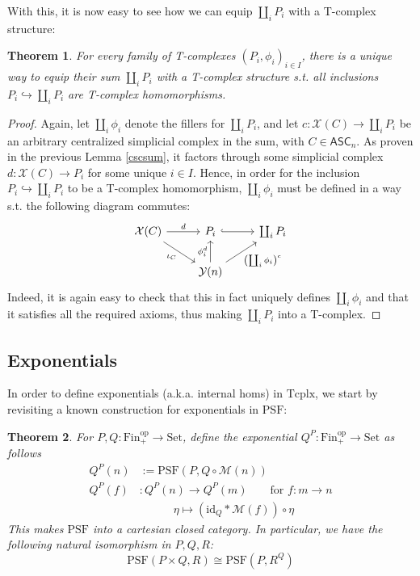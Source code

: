 \documentclass{article}
\newtheorem{theorem}{Theorem}[subsection]
\theoremstyle{remark}
\theoremstyle{definition}
\newcommand{\Fin}{\mathrm{Fin}}
\newcommand{\Set}{\mathrm{Set}}
\newcommand{\PSF}{\mathrm{PSF}}
\newcommand{\op}{\mathrm{op}}
\newcommand{\ASC}{\mathsf{ASC}}
\newcommand{\id}{\mathrm{id}}
\newcommand{\Y}{\mathcal Y}
\newcommand{\X}{\mathcal X}
\newcommand{\Tcplx}{\mathrm{Tcplx}}
\newcommand{\M}{\mathcal M}
\begin{document}
	With this, it is now easy to see how we can equip $\coprod_iP_i$ with a T-complex structure:
	\begin{theorem}
		For every family of T-complexes $(P_i,\phi_i)_{i\in I}$, there is a unique way to equip their sum $\coprod_iP_i$ with a T-complex structure s.t. all inclusions $P_i\hookrightarrow\coprod_iP_i$ are T-complex homomorphisms.
	\end{theorem}
	\begin{proof}
		Again, let $\coprod_i\phi_i$ denote the fillers for $\coprod_iP_i$, and let $c:\X(C)\to\coprod_iP_i$ be an arbitrary centralized simplicial complex in the sum, with $C\in\ASC_n$. As proven in the previous Lemma \ref{cscsum}, it factors through some simplicial complex $d:\X(C)\to P_i$ for some unique $i\in I$. Hence, in order for the inclusion $P_i\hookrightarrow\coprod_iP_i$ to be a T-complex homomorphism, $\coprod_i\phi_i$ must be defined in a way s.t. the following diagram commutes:
		\[\begin{tikzcd}
			\X(C)\arrow{r}{d}\arrow{dr}[swap]{\iota_C}&P_i\arrow[hook]{r}&\coprod_iP_i\\
			&\Y(n)\arrow{u}{\phi_i^d}\arrow{ur}[swap]{\left(\coprod_i\phi_i\right)^c}
		\end{tikzcd}\]
		Indeed, it is again easy to check that this in fact uniquely defines $\coprod_i\phi_i$ and that it satisfies all the required axioms, thus making $\coprod_iP_i$ into a T-complex.
	\end{proof}
	\subsection{Exponentials}
	In order to define exponentials (a.k.a. internal homs) in $\Tcplx$, we start by revisiting a known construction for exponentials in $\PSF$:
	\begin{theorem}
		For $P,Q:\Fin_+^\op\to\Set$, define the exponential $Q^P:\Fin_+^\op\to\Set$ as follows
		\begin{align*}
			Q^P(n)&:=\PSF(P,Q\circ\M(n))\\
			Q^P(f)&:Q^P(n)\to Q^P(m)\qquad\text{for }f:m\to n\\
			&\quad\qquad\eta\mapsto(\id_Q*\M(f))\circ\eta
		\end{align*}
		This makes $\PSF$ into a cartesian closed category. In particular, we have the following natural isomorphism in $P,Q,R$:
		\[\PSF(P\times Q, R)\cong\PSF(P,R^Q)\]
	\end{theorem}
\end{document}
